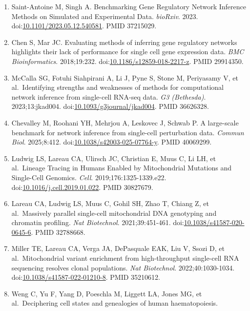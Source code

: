 \documentclass[11pt]{article}
\begin{document}
\begin{enumerate}
  PMID 31907445.
\item
  Saint-Antoine M, Singh A. Benchmarking Gene Regulatory Network
  Inference Methods on Simulated and Experimental Data. \emph{bioRxiv}.
  2023.
  doi:\href{https://doi.org/10.1101/2023.05.12.540581}{10.1101/2023.05.12.540581}.
  PMID 37215029.
\item
  Chen S, Mar JC. Evaluating methods of inferring gene regulatory
  networks highlights their lack of performance for single cell gene
  expression data. \emph{BMC Bioinformatics}. 2018;19:232.
  doi:\href{https://doi.org/10.1186/s12859-018-2217-z}{10.1186/s12859-018-2217-z}.
  PMID 29914350.
\item
  McCalla SG, Fotuhi Siahpirani A, Li J, Pyne S, Stone M, Periyasamy V,
  et al.~Identifying strengths and weaknesses of methods for
  computational network inference from single-cell RNA-seq data.
  \emph{G3 (Bethesda)}. 2023;13:jkad004.
  doi:\href{https://doi.org/10.1093/g3journal/jkad004}{10.1093/g3journal/jkad004}.
  PMID 36626328.
\item
  Chevalley M, Roohani YH, Mehrjou A, Leskovec J, Schwab P. A
  large-scale benchmark for network inference from single-cell
  perturbation data. \emph{Commun Biol}. 2025;8:412.
  doi:\href{https://doi.org/10.1038/s42003-025-07764-y}{10.1038/s42003-025-07764-y}.
  PMID 40069299.
\item
  Ludwig LS, Lareau CA, Ulirsch JC, Christian E, Muus C, Li LH, et
  al.~Lineage Tracing in Humans Enabled by Mitochondrial Mutations and
  Single-Cell Genomics. \emph{Cell}. 2019;176:1325-1339.e22.
  doi:\href{https://doi.org/10.1016/j.cell.2019.01.022}{10.1016/j.cell.2019.01.022}.
  PMID 30827679.
\item
  Lareau CA, Ludwig LS, Muus C, Gohil SH, Zhao T, Chiang Z, et
  al.~Massively parallel single-cell mitochondrial DNA genotyping and
  chromatin profiling. \emph{Nat Biotechnol}. 2021;39:451-461.
  doi:\href{https://doi.org/10.1038/s41587-020-0645-6}{10.1038/s41587-020-0645-6}.
  PMID 32788668.
\item
  Miller TE, Lareau CA, Verga JA, DePasquale EAK, Liu V, Ssozi D, et
  al.~Mitochondrial variant enrichment from high-throughput single-cell
  RNA sequencing resolves clonal populations. \emph{Nat Biotechnol}.
  2022;40:1030-1034.
  doi:\href{https://doi.org/10.1038/s41587-022-01210-8}{10.1038/s41587-022-01210-8}.
  PMID 35210612.
\item
  Weng C, Yu F, Yang D, Poeschla M, Liggett LA, Jones MG, et
  al.~Deciphering cell states and genealogies of human haematopoiesis.

\end{enumerate}
\end{document}
